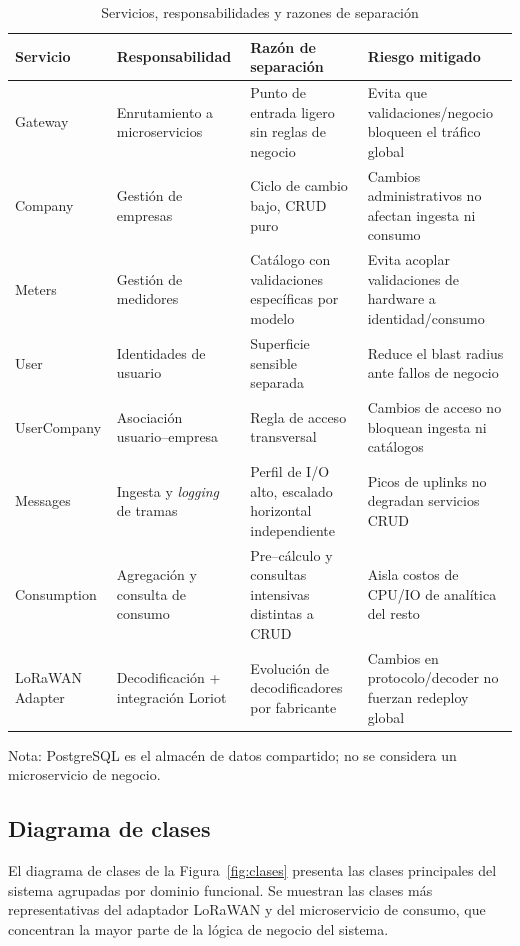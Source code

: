 \documentclass[12pt,a4paper,oneside]{report}
\begin{document}
\begin{table}[H]
\caption{Servicios, responsabilidades y razones de separación}\label{tab:servicios-razones}
\centering
\begin{tabularx}{\textwidth}{l l X X}
\toprule
\textbf{Servicio} & \textbf{Responsabilidad} & \textbf{Razón de separación} & \textbf{Riesgo mitigado} \\
\midrule
Gateway & Enrutamiento a microservicios & Punto de entrada ligero sin reglas de negocio & Evita que validaciones/negocio bloqueen el tráfico global \\
Company & Gestión de empresas & Ciclo de cambio bajo, CRUD puro & Cambios administrativos no afectan ingesta ni consumo \\
Meters & Gestión de medidores & Catálogo con validaciones específicas por modelo & Evita acoplar validaciones de hardware a identidad/consumo \\
User & Identidades de usuario & Superficie sensible separada & Reduce el blast radius ante fallos de negocio \\
UserCompany & Asociación usuario–empresa & Regla de acceso transversal & Cambios de acceso no bloquean ingesta ni catálogos \\
Messages & Ingesta y \textit{logging} de tramas & Perfil de I/O alto, escalado horizontal independiente & Picos de uplinks no degradan servicios CRUD \\
Consumption & Agregación y consulta de consumo & Pre–cálculo y consultas intensivas distintas a CRUD & Aisla costos de CPU/IO de analítica del resto \\
LoRaWAN Adapter & Decodificación + integración Loriot & Evolución de decodificadores por fabricante & Cambios en protocolo/decoder no fuerzan redeploy global \\
\bottomrule
\end{tabularx}
\vspace{2pt}
\footnotesize Nota: PostgreSQL es el almacén de datos compartido; no se considera un microservicio de negocio.
\end{table}

\subsection{Diagrama de clases}\label{subsec:clases}

El diagrama de clases de la Figura~\ref{fig:clases} presenta las clases principales del sistema agrupadas por dominio funcional. Se muestran las clases más representativas del adaptador LoRaWAN y del microservicio de consumo, que concentran la mayor parte de la lógica de negocio del sistema.
\end{document}
